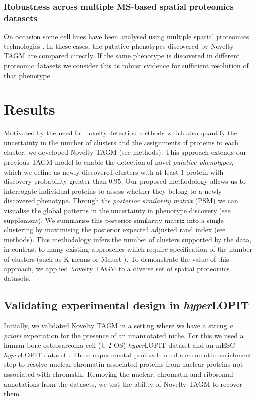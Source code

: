 \documentclass[12pt,english]{article}
\begin{document}
\subsubsection*{Robustness across multiple MS-based spatial proteomics datasets}
On occasion some cell lines have been analysed using multiple spatial proteomics technologies \citep{DC:2018}. In these cases, the putative phenotypes discovered by Novelty TAGM are compared directly. If the same phenotype is discovered in different proteomic datasets we consider this as robust evidence for sufficient resolution of that phenotype.
\clearpage
\section*{Results}
Motivated by the need for novelty detection methods which also quantify the uncertainty in the number of clusters and the assignments of proteins to each cluster, we developed Novelty TAGM (see methods). This approach extends our previous TAGM model \citep{Crook:2018} to enable the detection of novel \textit{putative phenotypes}, which we define as newly discovered clusters with at least $1$ protein with discovery probability greater than $0.95$. Our proposed methodology allows us to interrogate individual proteins to assess whether they belong to a newly discovered phenotype. Through the \textit{posterior similarity matrix} (PSM) we can visualise the global patterns in the uncertainty in phenotype discovery (see supplement). We summarise this posterior similarity matrix into a single clustering by maximising the posterior expected adjusted rand index (see methods). This methodology infers the number of clusters supported by the data, in contrast to many existing approaches which require specification of the number of clusters (such as K-means or Mclust \citep{mclust}). To demonstrate the value of this approach, we applied Novelty TAGM to a diverse set of spatial proteomics datasets.
\subsection*{Validating experimental design in \textit{hyper}LOPIT}
Initially, we validated Novelty TAGM in a setting where we have a strong \textit{a priori} expectation for the presence of an unannotated niche. For this we used a human bone osteosarcoma cell (U-2 OS) \textit{hyper}LOPIT dataset \citep{Thul:2017} and an mESC \textit{hyper}LOPIT dataset \citep{hyper}. These experimental protocols used a chromatin enrichment step to resolve nuclear chromatin-associated proteins from nuclear proteins not associated with chromatin. Removing the nuclear, chromatin and ribosomal annotations from the datasets, we test the ability of Novelty TAGM to recover them.
\end{document}
